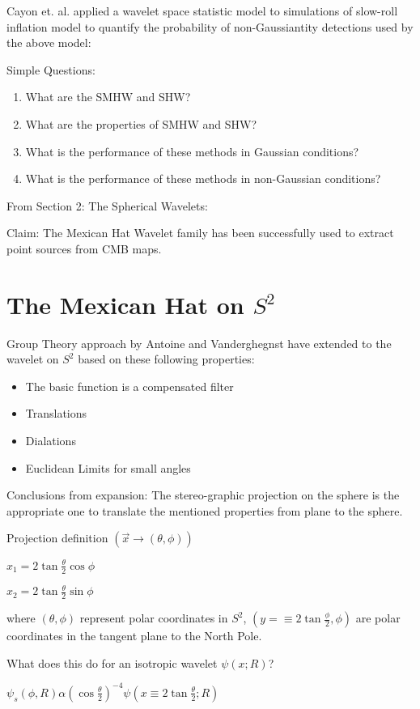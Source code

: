\documentclass[11pt]{article}
\begin{document}
Cayon et. al. applied a wavelet space statistic model to simulations of slow-roll inflation model to quantify the probability of non-Gaussiantity detections used by the above model:

Simple Questions:
\begin{enumerate}
\item What are the SMHW and SHW?
\item What are the properties of SMHW and SHW?
\item What is the performance of these methods in Gaussian conditions?  
\item What is the performance of these methods in non-Gaussian conditions?
\end{enumerate}

From Section 2:  The Spherical Wavelets:


Claim: The Mexican Hat Wavelet family has been successfully used to extract point sources from CMB maps.

\section {The Mexican Hat on $S^2$ }
Group Theory approach by Antoine and Vanderghegnst have extended to the wavelet on $S^2$ based on these following properties:
\begin{itemize}
\item The basic function is a compensated filter
\item Translations
\item Dialations
\item Euclidean Limits for small angles
\end{itemize}

Conclusions from expansion:
The stereo-graphic projection on the sphere is the appropriate one to translate the mentioned properties from plane to the sphere.  

Projection definition $(\vec{x} \to (\theta, \phi))$

$x_1 = 2 \tan \frac{\theta}{2} \cos \phi$

$x_2 = 2 \tan \frac{\theta}{2} \sin \phi $

where 
$ (\theta , \phi)$ represent polar coordinates in $S^2$, $(y=\equiv 2 \tan \frac{\phi}{2}, \phi)$ are polar coordinates in the tangent plane to the North Pole.  

What does this do for an isotropic wavelet $\psi(x;R)$?  

$\psi_s (\phi, R)\alpha (\cos \frac{\theta}{2} )^{-4} \psi(x\equiv 2 \tan \frac{\theta}{2}; R) $
\end{document}
